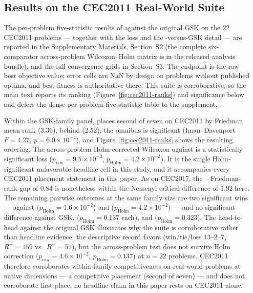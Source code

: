 \subsection{Results on the CEC2011 Real-World Suite}\label{sec:exp:cec2011}

The per-problem five-statistic results of \dtgsk{} against the original
GSK on the 22 CEC2011 problems --- together with the \egsk{} loss and the
\dtgsk{}-versus-GSK detail --- are reported in the Supplementary Materials,
Section~S2 (the complete six-comparator across-problem Wilcoxon--Holm
matrix is in the released analysis bundle), and the full convergence grids
in Section~S3. The endpoint is the raw best objective value; error cells
are NaN by design on problems without published optima, and best-fitness
is authoritative there. This suite is corroborative, so the main text
reports its ranking (Figure~\ref{fig:cec2011-ranks}) and significance
below and defers the dense per-problem five-statistic table to the
supplement.

Within the GSK-family panel, \dtgsk{} places second of seven on
CEC2011 by Friedman mean rank (3.36), behind \egsk{} (2.52); the
omnibus is significant (Iman--Davenport $F = 4.27$,
$p = 6.0 \times 10^{-4}$), and Figure~\ref{fig:cec2011-ranks} shows
the resulting ordering.
The across-problem Holm-corrected Wilcoxon against \egsk{} is a
statistically significant loss
($p_{\mathrm{raw}} = 9.5 \times 10^{-3}$,
$p_{\mathrm{Holm}} = 4.2 \times 10^{-2}$). It is the single
Holm-significant unfavorable headline cell in this study, and it
accompanies every CEC2011 placement statement in this paper. As on CEC2017,
the \dtgsk{}--\egsk{} Friedman-rank gap of $0.84$ is nonetheless within the
Nemenyi critical difference of $1.92$ here.
The remaining pairwise outcomes at the same family size are two
significant wins --- against \agsk{}
($p_{\mathrm{Holm}} = 1.6 \times 10^{-2}$) and \fdbagsk{}
($p_{\mathrm{Holm}} = 4.2 \times 10^{-2}$) --- and no significant difference against GSK,
\apgsk{} ($p_{\mathrm{Holm}} = 0.137$ each), and \atmals{}
($p_{\mathrm{Holm}} = 0.323$).
The head-to-head against the original GSK illustrates why the suite
is corroborative rather than headline evidence: the descriptive
record favors \dtgsk{} (win/tie/loss 13--2--7,
$R^{+} = 159$ vs.\ $R^{-} = 51$), but the across-problem test does
not survive Holm correction
($p_{\mathrm{raw}} = 4.6 \times 10^{-2}$,
$p_{\mathrm{Holm}} = 0.137$) at $n = 22$ problems.
CEC2011 therefore corroborates within-family competitiveness on
real-world problems at native dimensions --- a competitive placement
(second of seven) --- and does not corroborate first place; no headline
claim in this paper rests on CEC2011 alone.

